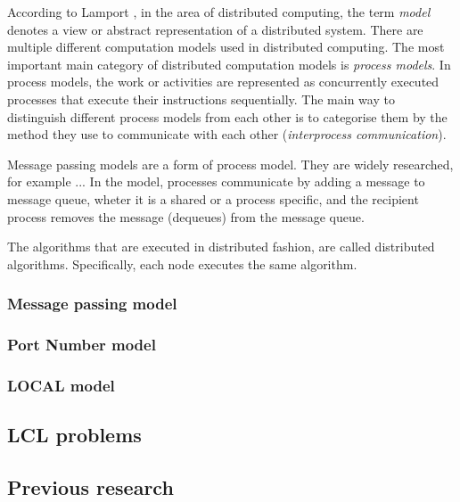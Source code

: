 According to Lamport \cite{DBLP:books/el/leeuwen90/LamportL90}, in the area of distributed computing, the term \emph{model} denotes a view or abstract representation of a distributed system.
There are multiple different computation models used in distributed computing.
The most important main category of distributed computation models is \emph{process models}.
In process models, the work or activities are represented as concurrently executed processes that execute their instructions sequentially.
The main way to distinguish different process models from each other is to categorise them by the method they use to communicate with each other (\emph{interprocess communication}).
\cite{DBLP:books/el/leeuwen90/LamportL90}

Message passing models are a form of process model.
They are widely researched, for example ... 
In the model, processes communicate by adding a message to message queue, wheter it is a shared or a process specific, and the recipient process removes the message (dequeues) from the message queue.
\cite{DBLP:books/el/leeuwen90/LamportL90}




The algorithms that are executed in distributed fashion, are called distributed algorithms. 
Specifically, each node executes the same algorithm.

\subsubsection{Message passing model} \label{sec:message_passing_model}
\subsubsection{Port Number model} \label{sec:port_number_model}
\subsubsection{LOCAL model} \label{sec:local_model}
\subsection{LCL problems} \label{sec:lcl_problems}
\subsection{Previous research} \label{sec:previous_research}
\clearpage

